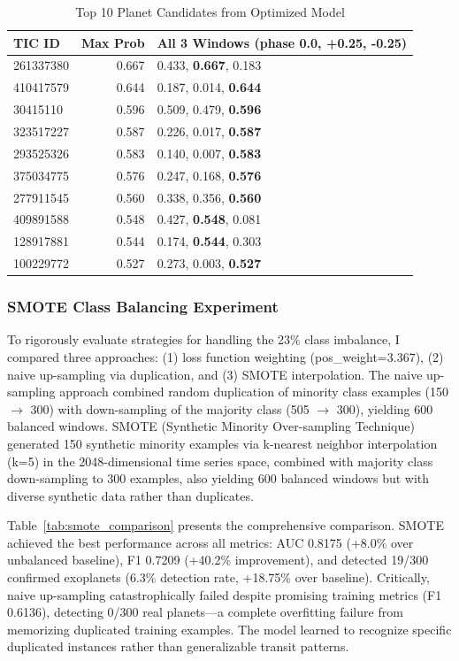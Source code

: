 \documentclass[letterpaper]{article} %
\begin{document}
\begin{table}[h]
\centering
\caption{Top 10 Planet Candidates from Optimized Model}
\label{tab:top_candidates}
\begin{tabular}{@{}lrp{3.2cm}@{}}
\toprule
\textbf{TIC ID} & \textbf{Max Prob} & \textbf{All 3 Windows (phase 0.0, +0.25, -0.25)} \\
\midrule
261337380 & 0.667 & 0.433, \textbf{0.667}, 0.183 \\
410417579 & 0.644 & 0.187, 0.014, \textbf{0.644} \\
30415110 & 0.596 & 0.509, 0.479, \textbf{0.596} \\
323517227 & 0.587 & 0.226, 0.017, \textbf{0.587} \\
293525326 & 0.583 & 0.140, 0.007, \textbf{0.583} \\
375034775 & 0.576 & 0.247, 0.168, \textbf{0.576} \\
277911545 & 0.560 & 0.338, 0.356, \textbf{0.560} \\
409891588 & 0.548 & 0.427, \textbf{0.548}, 0.081 \\
128917881 & 0.544 & 0.174, \textbf{0.544}, 0.303 \\
100229772 & 0.527 & 0.273, 0.003, \textbf{0.527} \\
\bottomrule
\end{tabular}
\end{table}
\subsubsection{SMOTE Class Balancing Experiment}

  To rigorously evaluate strategies for handling the 23\% class imbalance, I compared three approaches: (1) loss function weighting (pos\_weight=3.367), (2)     
  naive up-sampling via duplication, and (3) SMOTE interpolation. The naive up-sampling approach combined random duplication of minority class examples (150     
  $\rightarrow$ 300) with down-sampling of the majority class (505 $\rightarrow$ 300), yielding 600 balanced windows. SMOTE (Synthetic Minority Over-sampling    
   Technique) generated 150 synthetic minority examples via k-nearest neighbor interpolation (k=5) in the 2048-dimensional time series space, combined with      
  majority class down-sampling to 300 examples, also yielding 600 balanced windows but with diverse synthetic data rather than duplicates.

  Table~\ref{tab:smote_comparison} presents the comprehensive comparison. SMOTE achieved the best performance across all metrics: AUC 0.8175 (+8.0\% over        
  unbalanced baseline), F1 0.7209 (+40.2\% improvement), and detected 19/300 confirmed exoplanets (6.3\% detection rate, +18.75\% over baseline). Critically,    
   naive up-sampling catastrophically failed despite promising training metrics (F1 0.6136), detecting 0/300 real planets—a complete overfitting failure from    
   memorizing duplicated training examples. The model learned to recognize specific duplicated instances rather than generalizable transit patterns.
\end{document}
